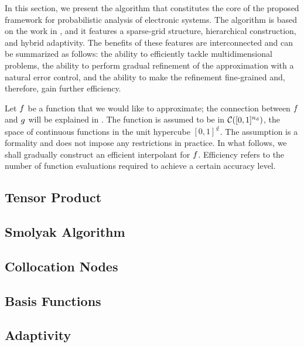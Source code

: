 In this section, we present the algorithm that constitutes the core of the
proposed framework for probabilistic analysis of electronic systems. The
algorithm is based on the work in \cite{jakeman2012, klimke2006, ma2009}, and it
features a sparse-grid structure, hierarchical construction, and hybrid
adaptivity. The benefits of these features are interconnected and can be
summarized as follows: the ability to efficiently tackle multidimensional
problems, the ability to perform gradual refinement of the approximation with a
natural error control, and the ability to make the refinement fine-grained and,
therefore, gain further efficiency.

Let $f$ be a function that we would like to approximate; the connection between
$f$ and $g$ will be explained in . The function is assumed to
be in $\mathcal{C}([0, 1]^{n_\text{d}})$, the space of continuous functions in the unit
hypercube $[0, 1]^\nin$. The assumption is a formality and does not impose any
restrictions in practice. In what follows, we shall gradually construct an
efficient interpolant for $f$. Efficiency refers to the number of function
evaluations required to achieve a certain accuracy level.

\subsection{Tensor Product} 


\subsection{Smolyak Algorithm} 



\subsection{Collocation Nodes} 



\subsection{Basis Functions} 


\subsection{Adaptivity} 



